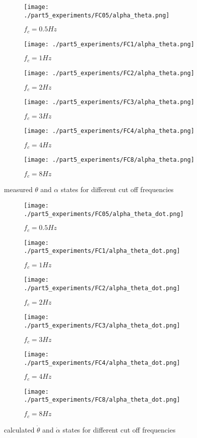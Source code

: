 \begin{figure}[H]
	\centering
	\begin{subfigure}[b]{0.4\textwidth}
		\texttt{[image: ./part5\_experiments/FC05/alpha\_theta.png]}
		\caption{$f_c=0.5Hz$}
	\end{subfigure}
	\begin{subfigure}[b]{0.4\textwidth}
		\texttt{[image: ./part5\_experiments/FC1/alpha\_theta.png]}
		\caption{$f_c=1Hz$}
	\end{subfigure}
	\begin{subfigure}[b]{0.4\textwidth}
		\texttt{[image: ./part5\_experiments/FC2/alpha\_theta.png]}
		\caption{$f_c=2Hz$}
	\end{subfigure}
	\begin{subfigure}[b]{0.4\textwidth}
		\texttt{[image: ./part5\_experiments/FC3/alpha\_theta.png]}
		\caption{$f_c=3Hz$}
	\end{subfigure}
	\begin{subfigure}[b]{0.4\textwidth}
		\texttt{[image: ./part5\_experiments/FC4/alpha\_theta.png]}
		\caption{$f_c=4Hz$}
	\end{subfigure}
	\begin{subfigure}[b]{0.4\textwidth}
		\texttt{[image: ./part5\_experiments/FC8/alpha\_theta.png]}
		\caption{$f_c=8Hz$}
	\end{subfigure}
	\caption{measured $\theta$ and $\alpha$ states for different cut off frequencies}
	\label{m_s_f}
\end{figure}
\begin{figure}[H]
	\centering
	\begin{subfigure}[b]{0.4\textwidth}
		\texttt{[image: ./part5\_experiments/FC05/alpha\_theta\_dot.png]}
		\caption{$f_c=0.5Hz$}
	\end{subfigure}
	\begin{subfigure}[b]{0.4\textwidth}
		\texttt{[image: ./part5\_experiments/FC1/alpha\_theta\_dot.png]}
		\caption{$f_c=1Hz$}
	\end{subfigure}
	\begin{subfigure}[b]{0.4\textwidth}
		\texttt{[image: ./part5\_experiments/FC2/alpha\_theta\_dot.png]}
		\caption{$f_c=2Hz$}
	\end{subfigure}
	\begin{subfigure}[b]{0.4\textwidth}
		\texttt{[image: ./part5\_experiments/FC3/alpha\_theta\_dot.png]}
		\caption{$f_c=3Hz$}
	\end{subfigure}
	\begin{subfigure}[b]{0.4\textwidth}
		\texttt{[image: ./part5\_experiments/FC4/alpha\_theta\_dot.png]}
		\caption{$f_c=4Hz$}
	\end{subfigure}
	\begin{subfigure}[b]{0.4\textwidth}
		\texttt{[image: ./part5\_experiments/FC8/alpha\_theta\_dot.png]}
		\caption{$f_c=8Hz$}
	\end{subfigure}
	\caption{calculated $\dot{\theta}$ and $\dot{\alpha}$ states for different cut off frequencies}
	\label{e_s_f}
\end{figure}

